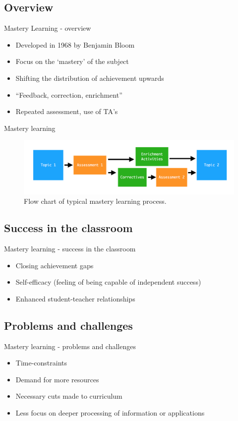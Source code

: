 \documentclass{beamer}
\begin{document}
\subsection{Overview}
\begin{frame}{Mastery Learning - overview}
  \begin{itemize}
    \item Developed in 1968 by Benjamin Bloom\pause
    \item Focus on the `mastery' of the subject\pause
    \item Shifting the distribution of achievement upwards\pause
    \item ``Feedback, correction, enrichment''\pause
    \item Repeated assessment, use of TA's
  \end{itemize}
\end{frame}
\begin{frame}{Mastery learning}
  \begin{figure}
    \centering
      \includegraphics[scale=0.35]{mlflow}
      \caption{Flow chart of typical mastery learning process.}
  \end{figure}
\end{frame}
\subsection{Success in the classroom}
\begin{frame}{Mastery learning - success in the classroom}\pause
  \begin{itemize}
    \item Closing achievement gaps\pause
    \item Self-efficacy (feeling of being capable of independent success)\pause
    \item Enhanced student-teacher relationships
  \end{itemize}
\end{frame}
\subsection{Problems and challenges}
\begin{frame}{Mastery learning - problems and challenges}\pause
  \begin{itemize}
    \item Time-constraints\pause
    \item Demand for more resources\pause
    \item Necessary cuts made to curriculum\pause
    \item Less focus on deeper processing of information or applications
  \end{itemize}
\end{frame}
\end{document}
